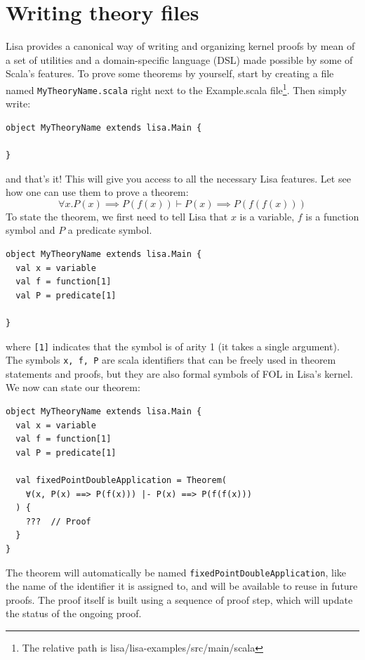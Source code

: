 \section{Writing theory files}
Lisa provides a canonical way of writing and organizing kernel proofs by mean of a set of utilities and a domain-specific language (DSL) made possible by some of Scala's features.
To prove some theorems by yourself, start by creating a file named \lstinline|MyTheoryName.scala| right next to the Example.scala file\footnote{The relative path is lisa/lisa-examples/src/main/scala}.
Then simply write:

\noindent
\begin{minipage}{\linewidth}\vspace{1em}
\begin{lstlisting}[language=lisa, frame=single]
object MyTheoryName extends lisa.Main {

}
\end{lstlisting}
\end{minipage}
and that's it! This will give you access to all the necessary Lisa features. Let see how one can use them to prove a theorem:
$$
\forall x. P(x) \implies P(f(x)) \vdash P(x) \implies P(f(f(x)))
$$
To state the theorem, we first need to tell Lisa that $x$ is a variable, $f$ is a function symbol and $P$ a predicate symbol.

\noindent
\begin{minipage}{\linewidth}\vspace{1em}
\begin{lstlisting}[language=lisa, frame=single]
object MyTheoryName extends lisa.Main {
  val x = variable
  val f = function[1]
  val P = predicate[1]

}
\end{lstlisting}
\end{minipage}

where \lstinline|[1]| indicates that the symbol is of arity 1 (it takes a single argument). The symbols \lstinline|x, f, P| are scala identifiers that can be freely used in theorem statements and proofs, but they are also formal symbols of FOL in Lisa's kernel.
We now can state our theorem:

\noindent
\begin{minipage}{\linewidth}\vspace{1em}
\begin{lstlisting}[language=lisa, frame=single]
object MyTheoryName extends lisa.Main {
  val x = variable
  val f = function[1]
  val P = predicate[1]

  val fixedPointDoubleApplication = Theorem(
    ∀(x, P(x) ==> P(f(x))) |- P(x) ==> P(f(f(x)))
  ) {
    ???  // Proof
  }
}
\end{lstlisting}
\end{minipage}
The theorem will automatically be named \lstinline|fixedPointDoubleApplication|, like the name of the identifier it is assigned to, and will be available to reuse in future proofs. The proof itself is built using a sequence of proof step, which will update the status of the ongoing proof.

